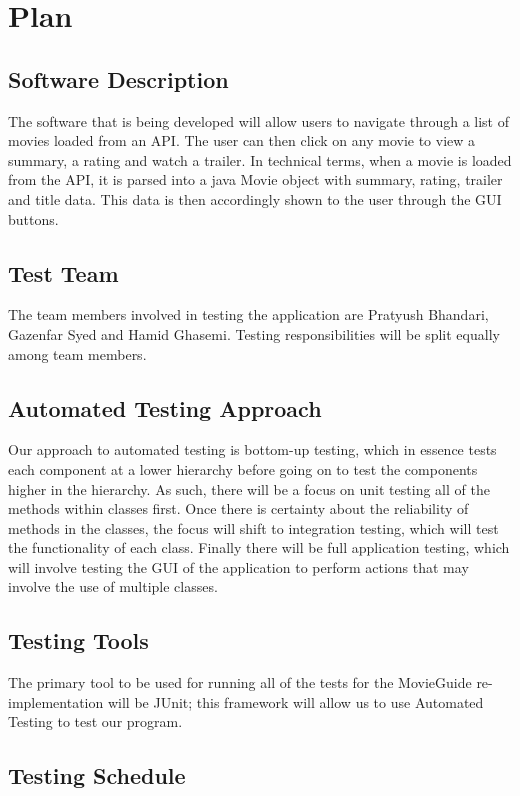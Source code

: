 \documentclass[12pt, titlepage]{article}
\begin{document}
\section{Plan}
	
\subsection{Software Description}
The software that is being developed will allow users to navigate through a list of movies loaded from an API. The user can then click on any movie to view a summary, a rating and watch a trailer. In technical terms, when a movie is loaded from the API, it is parsed into a java Movie object with summary, rating, trailer and title data. This data is then accordingly shown to the user through the GUI buttons.


\subsection{Test Team}
The team members involved in testing the application are Pratyush Bhandari, Gazenfar Syed and Hamid Ghasemi. Testing responsibilities will be split equally among team members.

\subsection{Automated Testing Approach}
Our approach to automated testing is bottom-up testing, which in essence tests each component at a lower hierarchy before going on to test the components higher in the hierarchy. As such, there will be a focus on unit testing all of the methods within classes first. Once there is certainty about the reliability of methods in the classes, the focus will shift to integration testing, which will test the functionality of each class. Finally there will be full application testing, which will involve testing the GUI of the application to perform actions that may involve  the use of multiple classes.

\subsection{Testing Tools}
The primary tool to be used for running all of the tests for the MovieGuide re-implementation will be JUnit; this framework will allow us to use Automated Testing to test our program.

\subsection{Testing Schedule}
		
\end{document}
